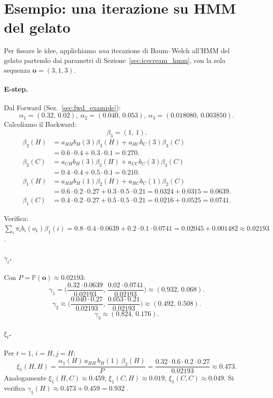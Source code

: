 \documentclass[11pt,a4paper,oneside]{book}
\theoremstyle{plain}
\theoremstyle{definition}
\theoremstyle{remark}
\newcommand{\Prob}{\mathbb{P}}
\newcommand{\seqobs}{\mathbf{o}}             %
\newcommand{\fwd}{\alpha}                    %
\newcommand{\bwd}{\beta}                     %
\newcommand{\gam}{\gamma}                    %
\newcommand{\xig}{\xi}                       %
\begin{document}
\section{Esempio: una iterazione su HMM del gelato}

Per fissare le idee, applichiamo \emph{una} iterazione di Baum--Welch
all'HMM del gelato partendo dai parametri di
Sezione~\ref{sec:icecream_hmm}, con la sola sequenza $\seqobs=(3,1,3)$.

\paragraph{E-step.} Dal Forward (Sez.~\ref{sec:fwd_example}):
\[
\fwd_1 = (0.32,\,0.02),\ \fwd_2=(0.040,\,0.053),\ \fwd_3=(0.018080,\,0.003850).
\]
Calcoliamo il Backward:
\[
\bwd_3 = (1,\,1).
\]
\begin{align*}
\bwd_2(H) &= a_{HH}b_H(3)\bwd_3(H)+a_{HC}b_C(3)\bwd_3(C)\\
          &= 0.6\cdot 0.4 + 0.3\cdot 0.1 = 0.270.\\
\bwd_2(C) &= a_{CH}b_H(3)\bwd_3(H)+a_{CC}b_C(3)\bwd_3(C)\\
          &= 0.4\cdot 0.4 + 0.5\cdot 0.1 = 0.210.\\
\bwd_1(H) &= a_{HH}b_H(1)\bwd_2(H)+a_{HC}b_C(1)\bwd_2(C)\\
          &= 0.6\cdot 0.2\cdot 0.27 + 0.3\cdot 0.5\cdot 0.21 = 0.0324 + 0.0315 = 0.0639.\\
\bwd_1(C) &= 0.4\cdot 0.2\cdot 0.27 + 0.5\cdot 0.5\cdot 0.21 = 0.0216 + 0.0525 = 0.0741.
\end{align*}

Verifica: $\sum_i \pi_i b_i(o_1)\bwd_1(i) = 0.8\cdot 0.4\cdot 0.0639 +
0.2\cdot 0.1\cdot 0.0741 = 0.02045 + 0.001482 \approx 0.02193$. \checkmark

\paragraph{$\gam_t$.} Con $P=\Prob(\seqobs)\approx 0.02193$:
\[
\gam_1 = \biggl(\frac{0.32\cdot 0.0639}{0.02193},\,
                \frac{0.02\cdot 0.0741}{0.02193}\biggr)
       \approx (0.932,\,0.068).
\]
\[
\gam_2 \approx \biggl(\frac{0.040\cdot 0.27}{0.02193},\,
                       \frac{0.053\cdot 0.21}{0.02193}\biggr)
       \approx (0.492,\,0.508).
\]
\[
\gam_3 \approx (0.824,\,0.176).
\]

\paragraph{$\xig_t$.} Per $t=1$, $i=H,j=H$:
\[
\xig_1(H,H)=\frac{\fwd_1(H)\,a_{HH}\,b_H(1)\,\bwd_2(H)}{P}
           = \frac{0.32\cdot 0.6\cdot 0.2\cdot 0.27}{0.02193}
           \approx 0.473.
\]
Analogamente $\xig_1(H,C)\approx 0.459$, $\xig_1(C,H)\approx 0.019$,
$\xig_1(C,C)\approx 0.049$. Si verifica
$\gam_1(H)\approx 0.473+0.459=0.932$ \checkmark.
\end{document}
